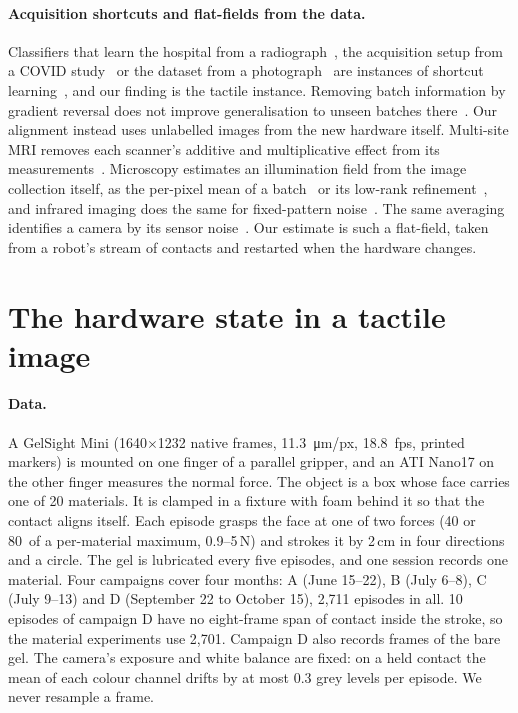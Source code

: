 \paragraph{Acquisition shortcuts and flat-fields from the data.}
Classifiers that learn the hospital from a radiograph~\cite{zech2018hospital}, the acquisition setup from a COVID study~\cite{degrave2021covid} or the dataset from a photograph~\cite{torralba2011bias,liuhe2025} are instances of shortcut learning~\cite{geirhos2020shortcut}, and our finding is the tactile instance. Removing batch information by gradient reversal does not improve generalisation to unseen batches there~\cite{sypetkowski2023rxrx1}. Our alignment instead uses unlabelled images from the new hardware itself. Multi-site MRI removes each scanner's additive and multiplicative effect from its measurements~\cite{fortin2017combat}. Microscopy estimates an illumination field from the image collection itself, as the per-pixel mean of a batch~\cite{singh2014illumination} or its low-rank refinement~\cite{peng2017basic}, and infrared imaging does the same for fixed-pattern noise~\cite{harris1999nuc}. The same averaging identifies a camera by its sensor noise~\cite{lukas2006prnu}. Our estimate is such a flat-field, taken from a robot's stream of contacts and restarted when the hardware changes.

\section{The hardware state in a tactile image}
\label{sec:signature}

\paragraph{Data.}
A GelSight Mini (1640$\times$1232 native frames, \SI{11.3}{\micro\metre}/px, \SI{18.8}{fps}, printed markers) is mounted on one finger of a parallel gripper, and an ATI Nano17 on the other finger measures the normal force. The object is a box whose face carries one of 20 materials. It is clamped in a fixture with foam behind it so that the contact aligns itself. Each episode grasps the face at one of two forces (40 or 80\pct\ of a per-material maximum, 0.9--5\,N) and strokes it by 2\,cm in four directions and a circle. The gel is lubricated every five episodes, and one session records one material. Four campaigns cover four months: A (June 15--22), B (July 6--8), C (July 9--13) and D (September 22 to October 15), 2,711 episodes in all. 10 episodes of campaign D have no eight-frame span of contact inside the stroke, so the material experiments use 2,701. Campaign D also records frames of the bare gel. The camera's exposure and white balance are fixed: on a held contact the mean of each colour channel drifts by at most 0.3 grey levels per episode. We never resample a frame.

